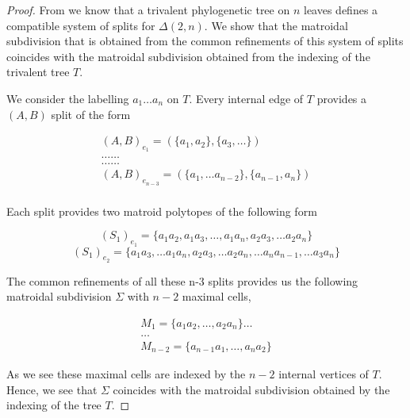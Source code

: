 \documentclass[12pt]{article}
\theoremstyle{plain}
\theoremstyle{definition}
\numberwithin{subcase}{case}
\DeclareMathOperator{\Gr}{Gr}
\begin{document}
\begin{proof}
From \cite{herrmann2008splitting} we know that a trivalent phylogenetic tree on $n$ leaves defines a compatible system of splits for $\Delta(2,n)$. We show that the matroidal subdivision that is obtained from the common refinements of this system of splits coincides with the matroidal subdivision obtained from the indexing of the trivalent tree $T$.

We consider the labelling $a_{1} \hdots a_{n}$ on $T$. Every internal edge of $T$ provides a $(A,B)$ split of the form 

\begin{align*}
(A,B)_{e_{1}} = (\{a_{1},a_{2}\}, \{a_{3}, \hdots \}) \\
\hdots                          \hdots \\
\hdots                          \hdots \\
(A,B)_{e_{n-3}} = (\{a_{1}, \hdots a_{n-2}\}, \{a_{n-1}, a_{n}\}) \\
\end{align*}

Each split provides two matroid polytopes of the following form 

\[ (S_{1})_{e_{1}} = \{ a_{1}a_{2}, a_{1}a_{3}, \hdots , a_{1}a_{n}, a_{2}a_{3}, \hdots a_{2}a_{n}\}
\]
\[ (S_{1})_{e_{2}} = \{ a_{1}a_{3}, \hdots  a_{1}a_{n}, a_{2}a_{3}, \hdots a_{2}a_{n}, \hdots a_{n}a_{n-1}, \hdots a_{3}a_{n} \}
\]

The common refinements of all these n-3 splits provides us the following matroidal subdivision $\Sigma$ with $n-2$ maximal cells,

\begin{align*}
    M_{1} = \{ a_{1}a_{2}, \hdots , a_{2}a_{n} \}
    \hdots                    \\
    \hdots \\
    M_{n-2} = \{ a_{n-1}a_{1}, \hdots , a_{n}a_{2} \}
\end{align*}

As we see these maximal cells are indexed by the $n-2$ internal vertices of $T$. Hence, we see that $\Sigma$ coincides with the matroidal subdivision obtained by the indexing of the tree $T$.
\end{proof}
\end{document}

